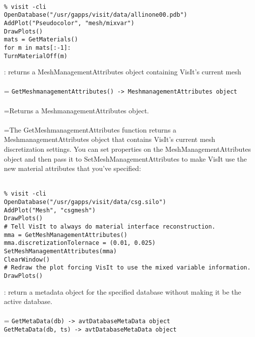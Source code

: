 \documentclass[10pt,a4paper]{report}
\begin{document}
\\[-6mm]
\begin{verbatim}% visit -cli
OpenDatabase("/usr/gapps/visit/data/allinone00.pdb")
AddPlot("Pseudocolor", "mesh/mixvar")
DrawPlots()
mats = GetMaterials()
for m in mats[:-1]:
TurnMaterialOff(m)
\end{verbatim}
\newpage


{}
: returns a MeshManagementAttributes object containing VisIt's current mesh\\[-3mm]

 \\ 
\hangindent=\parindent 
\verb!GetMeshmanagementAttributes() -> MeshmanagementAttributes object!\\ [-3mm]

 \\ 
\hangindent=\parindent Returns a MeshmanagementAttributes object. \\[-3mm] 

 \\ 
\hangindent=\parindent The GetMeshmanagementAttributes function returns a MeshmanagementAttributes object that contains VisIt's current mesh discretization settings. You can set properties on the MeshManagementAttributes object and then pass it to SetMeshManagementAttributes to make VisIt use the new material attributes that you've specified: \\[-3mm] 

\\[-6mm]
\begin{verbatim}% visit -cli
OpenDatabase("/usr/gapps/visit/data/csg.silo")
AddPlot("Mesh", "csgmesh")
DrawPlots()
# Tell VisIt to always do material interface reconstruction.
mma = GetMeshManagementAttributes()
mma.discretizationTolernace = (0.01, 0.025)
SetMeshManagementAttributes(mma)
ClearWindow()
# Redraw the plot forcing VisIt to use the mixed variable information.
DrawPlots()
\end{verbatim}
\newpage


{}
: return a metadata object for the specified database without making it be the active database.\\[-3mm]

 \\ 
\hangindent=\parindent 
\verb!GetMetaData(db) -> avtDatabaseMetaData object!\\ 
\verb!GetMetaData(db, ts) -> avtDatabaseMetaData object!\\ [-3mm]
\end{document}

